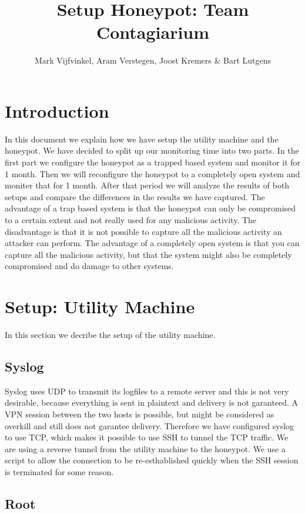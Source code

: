 \documentclass[11pt]{article} %
\title{Setup Honeypot: Team Contagiarium}
\author{Mark Vijfvinkel, Aram Verstegen, Joost Kremers \& Bart Lutgens}
\begin{document}
\maketitle

\section{Introduction}

In this document we explain how we have setup the utility machine and the honeypot. 
We have decided to split up our monitoring time into two parts. In the first part we configure the honeypot as a trapped based system and monitor it for 1 month.
Then we will reconfigure the honeypot to a completely open system and moniter that for 1 month. 
After that period we will analyze the results of both setups and compare the differences in the results we have captured. 
The advantage of a trap based system is that the honeypot can only be compromised to a certain extent and not really used for any malicious activity.
The disadvantage is that it is not possible to capture all the malicious activity an attacker can perform.
The advantage of a completely open system is that you can capture all the malicious activity, but that the system might also be completely compromised and do damage to other systems.


\section{Setup: Utility Machine}

In this section we decribe the setup of the utility machine.

\subsection{Syslog}
Syslog uses UDP to transmit its logfiles to a remote server and this is not very desirable, because everything is sent in plaintext and delivery is not garanteed.
A VPN session between the two hosts is possible, but might be considered as overkill and still does not garantee delivery.
Therefore we have configured syslog to use TCP, which makes it possible to use SSH to tunnel the TCP traffic.
We are using a reverse tunnel from the utility machine to the honeypot.
We use a script to allow the connection to be re-esthablished quickly when the SSH session is terminated for some reason. 
\cite{Remote_logging}

\subsection{Root}
\end{document}
